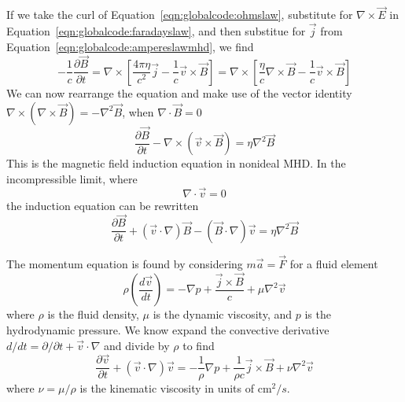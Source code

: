 \documentclass[letterpaper]{article}
\begin{document}
If we take the curl of Equation~\ref{eqn:globalcode:ohmslaw},
substitute for $\nabla\times\vec{E}$ in
Equation~\ref{eqn:globalcode:faradayslaw}, and then substitue for
$\vec{j}$ from Equation~\ref{eqn:globalcode:ampereslawmhd}, we find
\begin{equation}
-\frac{1}{c}\frac{\partial\vec{B}}{\partial t} = 
\nabla\times\left[\frac{4\pi\eta}{c^2}\vec{j} 
                  - \frac{1}{c}\vec{v}\times\vec{B}\right]
= \nabla\times\left[\frac{\eta}{c}\nabla\times\vec{B} 
                    - \frac{1}{c}\vec{v}\times\vec{B}\right]
\end{equation}
We can now rearrange the equation and make use of the vector identity
$\nabla\times(\nabla\times\vec{B}) = -\nabla^2\vec{B}$, when
$\nabla\cdot\vec{B}=0$
\begin{equation}
\frac{\partial\vec{B}}{\partial t} 
- \nabla\times\left(\vec{v}\times\vec{B}\right)
= \eta \nabla^2 \vec{B}
\label{eqn:globalcode:inductionequation}
\end{equation}
This is the magnetic field induction equation in nonideal MHD. In the
incompressible limit, where
\begin{equation}
\nabla\cdot\vec{v}=0
\label{eqn:globalcode:incompressibility}
\end{equation}
the induction equation can be rewritten
\begin{equation}
\frac{\partial\vec{B}}{\partial t} + (\vec{v}\cdot\nabla)\vec{B}
- (\vec{B}\cdot\nabla)\vec{v}
= \eta \nabla^2 \vec{B}
\label{eqn:globalcode:incompressibleinductionequation}
\end{equation}

The momentum equation is found by considering $m\vec{a} = \vec{F}$
for a fluid element
\begin{equation}
\rho\left(\frac{d\vec{v}}{dt}\right) = -\nabla p 
 + \frac{\vec{j}\times\vec{B}}{c} + \mu\nabla^2 \vec{v}
\end{equation}
where $\rho$ is the fluid density, $\mu$ is the dynamic viscosity, and
$p$ is the hydrodynamic pressure. We know expand the convective
derivative $d/dt = \partial/\partial t + \vec{v}\cdot\nabla$ and
divide by $\rho$ to find
\begin{equation}
\frac{\partial\vec{v}}{\partial t} + \left(\vec{v}\cdot \nabla\right)\vec{v}
 = -\frac{1}{\rho}\nabla p + \frac{1}{\rho c}\vec{j}\times\vec{B} 
 + \nu\nabla^2 \vec{v}
\end{equation}
where $\nu = \mu/\rho$ is the kinematic viscosity in units of cm$^2/s$.
\end{document}
